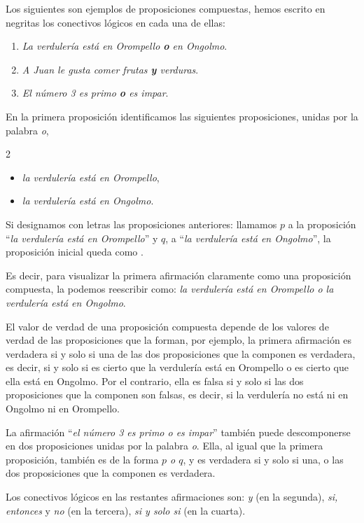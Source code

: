 \begin{ejemplo}
Los siguientes son ejemplos de proposiciones compuestas, hemos
escrito en negritas los conectivos l\'ogicos en cada una de ellas:
\begin{enumerate}
\item {\em La verdulería está en Orompello \textbf{o} en Ongolmo}.
\item {\em A Juan le gusta comer frutas \textbf{y} verduras}.
\item {\em El n\'umero 3 es primo \textbf{o} es impar}.
\end{enumerate}
En la primera proposición identificamos las siguientes proposiciones, 
unidas por la palabra {\em o}, 
\begin{multicols}{2}
\begin{itemize}
\item {\em la verdulería está en Orompello},
\item {\em la verdulería está en Ongolmo}.
\end{itemize}
\end{multicols}
Si designamos con letras las proposiciones anteriores: llamamos $p$
a la proposici\'on ``{\em la verdulería está en Orompello}''
y $q$, a ``{\em la verdulería está en Ongolmo}'',
la proposici\'on inicial queda como .

Es decir, para visualizar la primera afirmación 
claramente como una proposición compuesta, 
la podemos reescribir como: 
{\em la verdulería está en Orompello o la verdulería está en Ongolmo}.

El valor de verdad de una proposici\'on compuesta depende
de los valores de verdad de las proposiciones que la forman,
por ejemplo, la primera
afirmación es verdadera si y solo si una de 
las dos proposiciones 
que la componen es verdadera, es decir, si y solo si
es cierto que la verduler\'ia est\'a en Orompello o es cierto que ella
est\'a en Ongolmo.
Por el contrario, ella es falsa si y solo si 
las dos proposiciones que la componen son falsas, es decir, si la verduler\'ia
no est\'a ni en Ongolmo ni en Orompello.

La afirmaci\'on ``{\em el n\'umero 3 es primo o es impar}'' tambi\'en
puede descomponerse en dos proposiciones unidas por la palabra {\em o}.
Ella, al igual que la primera proposici\'on, tambi\'en es de la forma 
{\em $p$ o $q$}, y es verdadera si y solo si una, o las dos proposiciones
que la componen es verdadera.

Los conectivos l\'ogicos en las restantes afirmaciones son: 
{\em y} (en la segunda), {\em si, entonces} y {\em no} (en la tercera),
{\em si y solo si} (en la cuarta). 
\end{ejemplo}

